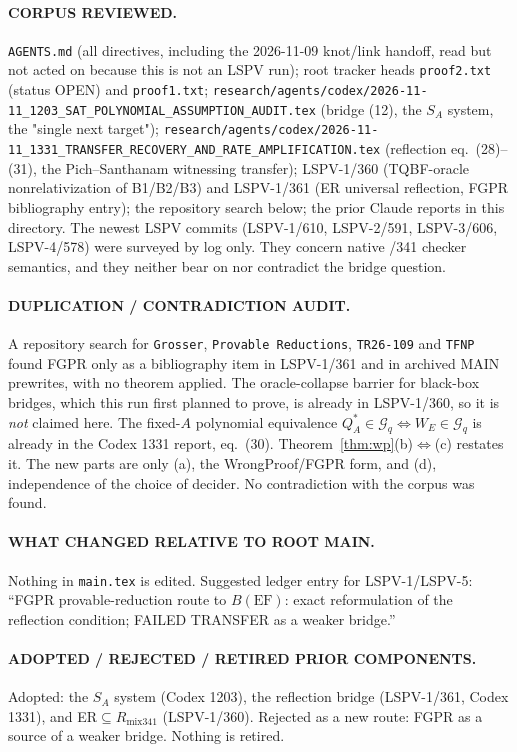 \documentclass[11pt]{article}
\theoremstyle{definition}
\theoremstyle{remark}
\newcommand{\EF}{\mathrm{EF}}
\begin{document}
\paragraph{CORPUS REVIEWED.}
\texttt{AGENTS.md} (all directives, including the 2026-11-09 knot/link handoff, read but not acted on because this is not an LSPV run);
root tracker heads \texttt{proof2.txt} (status OPEN) and \texttt{proof1.txt};
\texttt{research/agents/codex/2026-11-11\_1203\_SAT\_POLYNOMIAL\_ASSUMPTION\_AUDIT.tex} (bridge (12), the $S_A$ system,
the "single next target");
\texttt{research/agents/codex/2026-11-11\_1331\_TRANSFER\_RECOVERY\_AND\_RATE\_AMPLIFICATION.tex}
(reflection eq.~(28)--(31), the Pich--Santhanam witnessing transfer);
LSPV-1/360 (TQBF-oracle nonrelativization of B1/B2/B3) and LSPV-1/361 (ER universal reflection,
FGPR bibliography entry); the repository search below; the prior Claude reports in this directory.
The newest LSPV commits (LSPV-1/610, LSPV-2/591, LSPV-3/606, LSPV-4/578) were surveyed by log only. They concern
native /341 checker semantics, and they neither bear on nor contradict the bridge question.

\paragraph{DUPLICATION / CONTRADICTION AUDIT.}
A repository search for \texttt{Grosser}, \texttt{Provable Reductions}, \texttt{TR26-109} and \texttt{TFNP}
found FGPR only as a bibliography item in LSPV-1/361 and in archived MAIN prewrites, with no theorem applied.
The oracle-collapse barrier for black-box bridges, which this run first planned to prove, is already in LSPV-1/360,
so it is \emph{not} claimed here. The fixed-$A$ polynomial equivalence $Q^*_A\in\mathcal G_q\Leftrightarrow W_E\in\mathcal G_q$ is
already in the Codex 1331 report, eq.~(30). Theorem~\ref{thm:wp}(b)$\Leftrightarrow$(c) restates it. The new parts are
only (a), the WrongProof/FGPR form, and (d), independence of the choice of decider.
No contradiction with the corpus was found.

\paragraph{WHAT CHANGED RELATIVE TO ROOT MAIN.}
Nothing in \texttt{main.tex} is edited. Suggested ledger entry for LSPV-1/LSPV-5: ``FGPR provable-reduction route
to $B(\EF)$: exact reformulation of the reflection condition; FAILED TRANSFER as a weaker bridge.''

\paragraph{ADOPTED / REJECTED / RETIRED PRIOR COMPONENTS.}
Adopted: the $S_A$ system (Codex 1203), the reflection bridge (LSPV-1/361, Codex 1331), and ER$\subseteq R_{\mathrm{mix341}}$ (LSPV-1/360).
Rejected as a new route: FGPR as a source of a weaker bridge. Nothing is retired.
\end{document}
